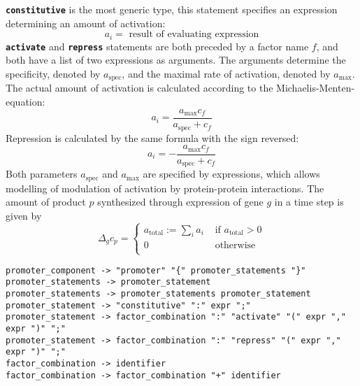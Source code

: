 \documentclass[12pt]{article}
\newcommand{\amax}{\ensuremath{a_{\mathrm{max}}}}
\newcommand{\aspec}{\ensuremath{a_{\mathrm{spec}}}}
\newcommand{\factorvar}[1]{\ensuremath{\mathit{#1}}}
\newcommand{\factorconc}[1]{\ensuremath{c_{#1}}}
\newcommand{\genevar}[1]{\ensuremath{\mathit{#1}}}
\newcommand{\keyword}[1]{\textbf{\texttt{#1}}}
\begin{document}
\keyword{constitutive} is the most generic type, this statement
specifies an expression determining an amount of activation:
\begin{equation}
a_i = \mbox{ result of evaluating expression}
\end{equation}
\keyword{activate} and \keyword{repress} statements are both
preceded by a factor name $\factorvar{f}$, and both have a list of two
expressions as arguments. The arguments determine the specificity,
denoted by $\aspec$, and the maximal rate of activation, denoted by
$\amax$. The actual amount of activation is calculated according to
the Michaelis-Menten-equation:
\begin{equation}
a_i = \frac{\amax \factorconc{\factorvar{f}}}{\aspec + \factorconc{\factorvar{f}}}
\end{equation}
Repression is calculated by the same formula with the sign reversed:
\begin{equation}
a_i = -\frac{\amax \factorconc{\factorvar{f}}}{\aspec + \factorconc{\factorvar{f}}}
\end{equation}
Both parameters $\aspec$ and $\amax$ are specified by expressions,
which allows modelling of modulation of activation by protein-protein
interactions. The amount of product $\factorvar{p}$ synthesized
through expression of gene $\genevar{g}$ in a time step is given by
\begin{equation}
\label{eq_delta_g_fconc}
\Delta_{\genevar{g}} \factorconc{\factorvar{p}} = \left\{
\begin{array}{ll}
a_{\mathrm{total}} := \sum_i a_i & \mbox{ if } a_{\mathrm{total}} > 0 \\
0 & \mbox{ otherwise} \\
\end{array}
\right.
\end{equation}
\begin{footnotesize}
\begin{verbatim}
promoter_component -> "promoter" "{" promoter_statements "}"
promoter_statements -> promoter_statement
promoter_statements -> promoter_statements promoter_statement
promoter_statement -> "constitutive" ":" expr ";"
promoter_statement -> factor_combination ":" "activate" "(" expr "," expr ")" ";"
promoter_statement -> factor_combination ":" "repress" "(" expr "," expr ")" ";"
factor_combination -> identifier
factor_combination -> factor_combination "+" identifier
\end{verbatim}
\end{footnotesize}
\end{document}
